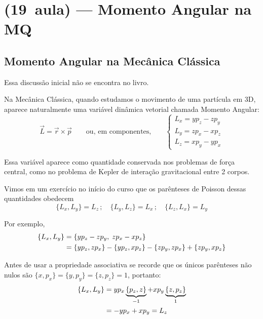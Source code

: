 \section*{(19\textordfeminine\ aula) --- Momento Angular na MQ}

\subsection*{Momento Angular na Mecânica Clássica}

Essa discussão inicial não se encontra no livro.

Na Mecânica Clássica, quando estudamos o movimento de uma partícula em 3D, aparece naturalmente uma variável dinâmica vetorial chamada Momento Angular:
\begin{equation}
    \vec{L} = \vec{r} \times \vec{p} \qquad \text{ou, em componentes,} \qquad
    \begin{cases}
        L_x = y p_z - z p_y \\
        L_y = z p_x - x p_z \\
        L_z = x p_y - y p_x
    \end{cases}
\label{eq:aula19_L_def}
\end{equation}

Essa variável aparece como quantidade conservada nos problemas de força central, como no problema de Kepler de interação gravitacional entre 2 corpos.

Vimos em um exercício no início do curso que os parênteses de Poisson dessas quantidades obedecem
\begin{equation}
    \boxed{\{L_x, L_y\} = L_z \,; \quad \{L_y, L_z\} = L_x \,; \quad \{L_z, L_x\} = L_y}
\label{eq:aula19_poisson_L}
\end{equation}

Por exemplo,
\begin{align}
    \{L_x, L_y\} &= \{y p_z - z p_y, \; z p_x - x p_z\} \notag \\
    &= \{y p_z, z p_x\} - \{y p_z, x p_z\} - \{z p_y, z p_x\} + \{z p_y, x p_z\}
\label{eq:aula19_exemplo_poisson_1}
\end{align}

Antes de usar a propriedade associativa se recorde que os únicos parênteses não nulos são $\{x, p_x\} = \{y, p_y\} = \{z, p_z\} = 1$, portanto:
\begin{align}
    \{L_x, L_y\} &= y p_x \underbrace{\{p_z, z\}}_{-1} + x p_y \underbrace{\{z, p_z\}}_{1} \notag \\
    &= -y p_x + x p_y = L_z
\label{eq:aula19_exemplo_poisson_2}
\end{align}

